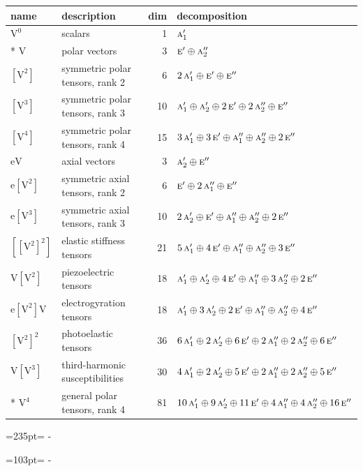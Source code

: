 \documentclass[10pt,a4paper]{article}
\newcommand{\needspace}[1]{\par\penalty-100\begingroup\dimen0=#1\relax\dimen2=\pagegoal
  \advance\dimen2-\pagetotal\ifdim\dimen0>\dimen2\relax\ifdim\dimen2>0pt\vfil\break\fi\fi
  \endgroup}
\numberwithin{equation}{section}
\newcommand{\irr}[1]{\text{\normalfont\scshape #1}}
\newcommand{\jahn}[1]{\mathrm{#1}}
\newlength{\fillwidth}\newlength{\cellwidth}\newlength{\colwidth}
\begin{document}
{\begin{longtable}{@{}llr>{\RaggedRight\arraybackslash}p{\fillwidth}@{}}
name & description & dim & decomposition\\\midrule\endhead
\bottomrule\endfoot\endlastfoot
$\jahn{V^{0}}$ & scalars & 1 & $\irr{a}_{1}'$\\*
$\jahn{V}$ & polar vectors & 3 & $\irr{e}' \oplus\allowbreak \irr{a}_{2}''$\\
$\jahn{[V^{2}]}$ & symmetric polar tensors, rank 2 & 6 & $2\,\irr{a}_{1}' \oplus\allowbreak \irr{e}' \oplus\allowbreak \irr{e}''$\\
$\jahn{[V^{3}]}$ & symmetric polar tensors, rank 3 & 10 & $\irr{a}_{1}' \oplus\allowbreak \irr{a}_{2}' \oplus\allowbreak 2\,\irr{e}' \oplus\allowbreak 2\,\irr{a}_{2}'' \oplus\allowbreak \irr{e}''$\\
$\jahn{[V^{4}]}$ & symmetric polar tensors, rank 4 & 15 & $3\,\irr{a}_{1}' \oplus\allowbreak 3\,\irr{e}' \oplus\allowbreak \irr{a}_{1}'' \oplus\allowbreak \irr{a}_{2}'' \oplus\allowbreak 2\,\irr{e}''$\\
$\jahn{eV}$ & axial vectors & 3 & $\irr{a}_{2}' \oplus\allowbreak \irr{e}''$\\
$\jahn{e[V^{2}]}$ & symmetric axial tensors, rank 2 & 6 & $\irr{e}' \oplus\allowbreak 2\,\irr{a}_{1}'' \oplus\allowbreak \irr{e}''$\\
$\jahn{e[V^{3}]}$ & symmetric axial tensors, rank 3 & 10 & $2\,\irr{a}_{2}' \oplus\allowbreak \irr{e}' \oplus\allowbreak \irr{a}_{1}'' \oplus\allowbreak \irr{a}_{2}'' \oplus\allowbreak 2\,\irr{e}''$\\
$\jahn{[[V^{2}]^{2}]}$ & elastic stiffness tensors & 21 & $5\,\irr{a}_{1}' \oplus\allowbreak 4\,\irr{e}' \oplus\allowbreak \irr{a}_{1}'' \oplus\allowbreak \irr{a}_{2}'' \oplus\allowbreak 3\,\irr{e}''$\\
$\jahn{V[V^{2}]}$ & piezoelectric tensors & 18 & $\irr{a}_{1}' \oplus\allowbreak \irr{a}_{2}' \oplus\allowbreak 4\,\irr{e}' \oplus\allowbreak \irr{a}_{1}'' \oplus\allowbreak 3\,\irr{a}_{2}'' \oplus\allowbreak 2\,\irr{e}''$\\
$\jahn{e[V^{2}]V}$ & electrogyration tensors & 18 & $\irr{a}_{1}' \oplus\allowbreak 3\,\irr{a}_{2}' \oplus\allowbreak 2\,\irr{e}' \oplus\allowbreak \irr{a}_{1}'' \oplus\allowbreak \irr{a}_{2}'' \oplus\allowbreak 4\,\irr{e}''$\\
$\jahn{[V^{2}]^{2}}$ & photoelastic tensors & 36 & $6\,\irr{a}_{1}' \oplus\allowbreak 2\,\irr{a}_{2}' \oplus\allowbreak 6\,\irr{e}' \oplus\allowbreak 2\,\irr{a}_{1}'' \oplus\allowbreak 2\,\irr{a}_{2}'' \oplus\allowbreak 6\,\irr{e}''$\\
$\jahn{V[V^{3}]}$ & third-harmonic susceptibilities & 30 & $4\,\irr{a}_{1}' \oplus\allowbreak 2\,\irr{a}_{2}' \oplus\allowbreak 5\,\irr{e}' \oplus\allowbreak 2\,\irr{a}_{1}'' \oplus\allowbreak 2\,\irr{a}_{2}'' \oplus\allowbreak 5\,\irr{e}''$\\*
$\jahn{V^{4}}$ & general polar tensors, rank 4 & 81 & $10\,\irr{a}_{1}' \oplus\allowbreak 9\,\irr{a}_{2}' \oplus\allowbreak 11\,\irr{e}' \oplus\allowbreak 4\,\irr{a}_{1}'' \oplus\allowbreak 4\,\irr{a}_{2}'' \oplus\allowbreak 16\,\irr{e}''$\\
\bottomrule\end{longtable}}
\needspace{235pt}
\needspace{103pt}
\end{document}
